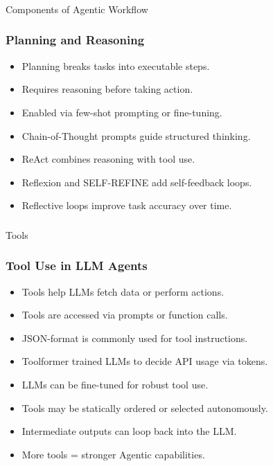 \begin{frame}[fragile]\frametitle{}
\begin{center}
{\Large Components of Agentic Workflow}
\end{center}
\end{frame}

\begin{frame}[fragile]\frametitle{Planning and Reasoning}

      \begin{itemize}
        \item Planning breaks tasks into executable steps.
        \item Requires reasoning before taking action.
        \item Enabled via few-shot prompting or fine-tuning.
        \item Chain-of-Thought prompts guide structured thinking.
        \item ReAct combines reasoning with tool use.
        \item Reflexion and SELF-REFINE add self-feedback loops.
        \item Reflective loops improve task accuracy over time.
      \end{itemize}

\end{frame}

\begin{frame}[fragile]\frametitle{}
\begin{center}
{\Large Tools}
\end{center}
\end{frame}

\begin{frame}[fragile]\frametitle{Tool Use in LLM Agents}

      \begin{itemize}
        \item Tools help LLMs fetch data or perform actions.
        \item Tools are accessed via prompts or function calls.
        \item JSON-format is commonly used for tool instructions.
        \item Toolformer trained LLMs to decide API usage via tokens.
        \item LLMs can be fine-tuned for robust tool use.
        \item Tools may be statically ordered or selected autonomously.
        \item Intermediate outputs can loop back into the LLM.
        \item More tools = stronger Agentic capabilities.
      \end{itemize}

\end{frame}

